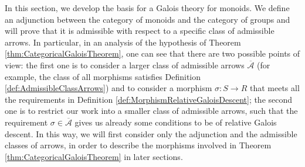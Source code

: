 In this section, we develop the basis for a Galois theory for monoids. We define an adjunction between the category of monoids and the category of groups and will prove that it is admissible with respect to a specific class of admissible arrows. In particular, in an analysis of the hypothesis of Theorem \ref{thm:CategoricalGaloisTheorem}, one can see that there are two possible points of view: the first one is to consider a larger class of admissible arrows $\overline{\mathcal{A}}$ (for example, the class of all morphisms satisfies Definition \ref{def:AdmissibleClassArrows}) and to consider a morphism $\sigma:S\to R$ that meets all the requirements in Definition \ref{def:MorphismRelativeGaloisDescent}; the second one is to restrict our work into a smaller class of admissible arrows, such that the requirement $\sigma\in\overline{\mathcal{A}}$ gives us already some conditions to be of relative Galois descent. In this way, we will first consider only the adjunction and the admissible classes of arrows, in order to describe the morphisms involved in Theorem \ref{thm:CategoricalGaloisTheorem} in later sections.

